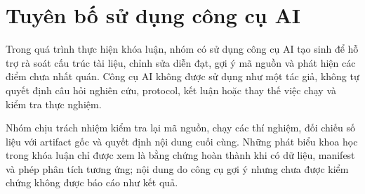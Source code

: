 \chapter*{Tuyên bố sử dụng công cụ AI}

Trong quá trình thực hiện khóa luận, nhóm có sử dụng công cụ AI tạo sinh để hỗ
trợ rà soát cấu trúc tài liệu, chỉnh sửa diễn đạt, gợi ý mã nguồn và phát hiện
các điểm chưa nhất quán. Công cụ AI không được sử dụng như một tác giả, không
tự quyết định câu hỏi nghiên cứu, protocol, kết luận hoặc thay thế việc chạy và
kiểm tra thực nghiệm.

Nhóm chịu trách nhiệm kiểm tra lại mã nguồn, chạy các thí nghiệm, đối chiếu số
liệu với artifact gốc và quyết định nội dung cuối cùng. Những phát biểu khoa học
trong khóa luận chỉ được xem là bằng chứng hoàn thành khi có dữ liệu, manifest
và phép phân tích tương ứng; nội dung do công cụ gợi ý nhưng chưa được kiểm
chứng không được báo cáo như kết quả.
\clearpage
